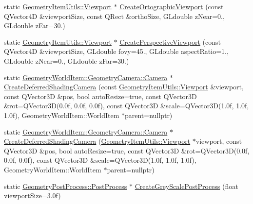 \begin{DoxyCompactItemize}
\item 
static \mbox{\hyperlink{class_geometry_engine_1_1_geometry_item_utils_1_1_viewport}{Geometry\+Item\+Utils\+::\+Viewport}} $\ast$ \mbox{\hyperlink{class_geometry_engine_1_1_geometry_factory_a27855bee8a087a66034ee5001a023241}{Create\+Ortographic\+Viewport}} (const Q\+Vector4D \&viewport\+Size, const Q\+Rect \&ortho\+Size, G\+Ldouble z\+Near=0., G\+Ldouble z\+Far=30.)
\item 
static \mbox{\hyperlink{class_geometry_engine_1_1_geometry_item_utils_1_1_viewport}{Geometry\+Item\+Utils\+::\+Viewport}} $\ast$ \mbox{\hyperlink{class_geometry_engine_1_1_geometry_factory_ab29bf1ed42ffb4054a8d19c292bcbaea}{Create\+Perspective\+Viewport}} (const Q\+Vector4D \&viewport\+Size, G\+Ldouble fovy=45., G\+Ldouble aspect\+Ratio=1., G\+Ldouble z\+Near=0., G\+Ldouble z\+Far=30.)
\item 
static \mbox{\hyperlink{class_geometry_engine_1_1_geometry_world_item_1_1_geometry_camera_1_1_camera}{Geometry\+World\+Item\+::\+Geometry\+Camera\+::\+Camera}} $\ast$ \mbox{\hyperlink{class_geometry_engine_1_1_geometry_factory_aa86c9233dff0a18e99208de4de0153f3}{Create\+Deferred\+Shading\+Camera}} (const \mbox{\hyperlink{class_geometry_engine_1_1_geometry_item_utils_1_1_viewport}{Geometry\+Item\+Utils\+::\+Viewport}} \&viewport, const Q\+Vector3D \&pos, bool auto\+Resize=true, const Q\+Vector3D \&rot=Q\+Vector3D(0.\+0f, 0.\+0f, 0.\+0f), const Q\+Vector3\+D \&scale=\+Q\+Vector3\+D(1.\+0f, 1.\+0f, 1.\+0f), Geometry\+World\+Item\+::\+World\+Item $\ast$parent=nullptr)
\item 
static \mbox{\hyperlink{class_geometry_engine_1_1_geometry_world_item_1_1_geometry_camera_1_1_camera}{Geometry\+World\+Item\+::\+Geometry\+Camera\+::\+Camera}} $\ast$ \mbox{\hyperlink{class_geometry_engine_1_1_geometry_factory_aead6db17ffba74414f9878636ba4f18a}{Create\+Deferred\+Shading\+Camera}} (\mbox{\hyperlink{class_geometry_engine_1_1_geometry_item_utils_1_1_viewport}{Geometry\+Item\+Utils\+::\+Viewport}} $\ast$viewport, const Q\+Vector3D \&pos, bool auto\+Resize=true, const Q\+Vector3D \&rot=Q\+Vector3D(0.\+0f, 0.\+0f, 0.\+0f), const Q\+Vector3\+D \&scale=\+Q\+Vector3\+D(1.\+0f, 1.\+0f, 1.\+0f), Geometry\+World\+Item\+::\+World\+Item $\ast$parent=nullptr)
\item 
static \mbox{\hyperlink{class_geometry_engine_1_1_geometry_post_process_1_1_post_process}{Geometry\+Post\+Process\+::\+Post\+Process}} $\ast$ \mbox{\hyperlink{class_geometry_engine_1_1_geometry_factory_ae22f129b89273bd47bbb9537901a818a}{Create\+Grey\+Scale\+Post\+Process}} (float viewport\+Size=3.\+0f)

\end{DoxyCompactItemize}
